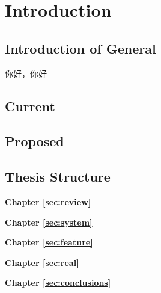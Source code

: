 %
\chapter{Introduction}
\label{sec:intro}


\blindtext

\section{Introduction of General}
\label{sec:intro:general}
  你好，你好
\blindtext

\section{Current}
\label{sec:intro:current}

\blindtext

\section{Proposed}
\label{sec:intro:new}

\blindtext

\section{Thesis Structure}
\label{sec:intro:structure}

\textbf{Chapter \ref{sec:review}} \\[0.2em]
\blindtext

\textbf{Chapter \ref{sec:system}} \\[0.2em]
\blindtext

\textbf{Chapter \ref{sec:feature}} \\[0.2em]
\blindtext

\textbf{Chapter \ref{sec:real}} \\[0.2em]
\blindtext

\textbf{Chapter \ref{sec:conclusions}} \\[0.2em]
\blindtext
